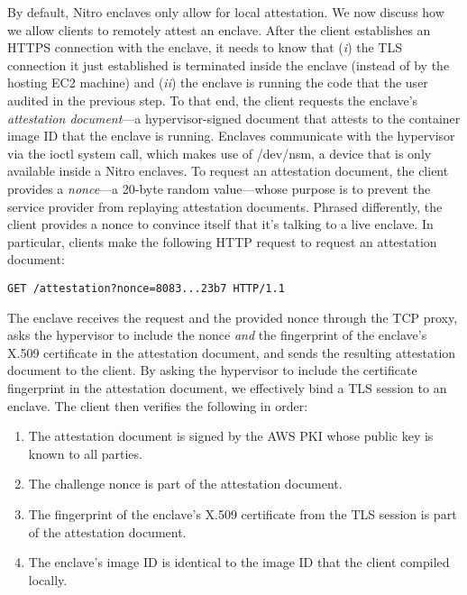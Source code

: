 By default, Nitro enclaves only allow for local attestation.  We now discuss how
we allow clients to remotely attest an enclave.  After the client establishes an
HTTPS connection with the enclave, it needs to know that (\emph{i}) the TLS
connection it just established is terminated inside the enclave (instead of by
the hosting EC2 machine) and (\emph{ii}) the enclave is running the code that
the user audited in the previous step.  To that end, the client requests the
enclave's \emph{attestation document}---a hypervisor-signed document that
attests to the container image ID that the enclave is running.  Enclaves
communicate with the hypervisor via the ioctl system call, which makes use of
/dev/nsm, a device that is only available inside a Nitro enclaves.  To request
an attestation document, the client provides a \emph{nonce}---a 20-byte random
value---whose purpose is to prevent the service provider from replaying
attestation documents.  Phrased differently, the client provides a nonce to
convince itself that it's talking to a live enclave.  In particular, clients
make the following HTTP request to request an attestation document:

\begin{lstlisting}[numbers=none,basicstyle=\small\ttfamily]
GET /attestation?nonce=8083...23b7 HTTP/1.1
\end{lstlisting}

The enclave receives the request and the provided nonce through the TCP proxy,
asks the hypervisor to include the nonce \emph{and} the fingerprint of the
enclave's X.509 certificate in the attestation document, and sends the resulting
attestation document to the client.  By asking the hypervisor to include the
certificate fingerprint in the attestation document, we effectively bind a TLS
session to an enclave.  The client then verifies the following in order:

\begin{enumerate}
    \item The attestation document is signed by the AWS PKI whose public key is
      known to all parties.
    \item The challenge nonce is part of the attestation document.
    \item The fingerprint of the enclave's X.509 certificate from the TLS session is part of the
      attestation document.
    \item The enclave's image ID is identical to the image ID that the client
      compiled locally.
\end{enumerate}

